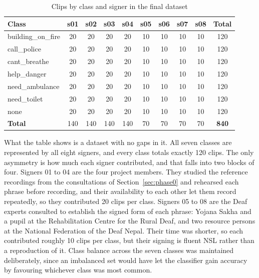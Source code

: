 \begin{table}[htbp]
    \centering
    \caption{Clips by class and signer in the final dataset}
    \label{tab:composition}
    \small
    \setlength{\tabcolsep}{4pt}
    \begin{tabular}{lcccccccc|c}
        \toprule
        \textbf{Class} & \textbf{s01} & \textbf{s02} & \textbf{s03} & \textbf{s04}
                       & \textbf{s05} & \textbf{s06} & \textbf{s07} & \textbf{s08} & \textbf{Total} \\
        \midrule
        building\_on\_fire & 20 & 20 & 20 & 20 & 10 & 10 & 10 & 10 & 120 \\
        call\_police       & 20 & 20 & 20 & 20 & 10 & 10 & 10 & 10 & 120 \\
        cant\_breathe      & 20 & 20 & 20 & 20 & 10 & 10 & 10 & 10 & 120 \\
        help\_danger       & 20 & 20 & 20 & 20 & 10 & 10 & 10 & 10 & 120 \\
        need\_ambulance    & 20 & 20 & 20 & 20 & 10 & 10 & 10 & 10 & 120 \\
        need\_toilet       & 20 & 20 & 20 & 20 & 10 & 10 & 10 & 10 & 120 \\
        none               & 20 & 20 & 20 & 20 & 10 & 10 & 10 & 10 & 120 \\
        \midrule
        \textbf{Total} & 140 & 140 & 140 & 140 & 70 & 70 & 70 & 70 & \textbf{840} \\
        \bottomrule
    \end{tabular}
\end{table}

\noindent What the table shows is a dataset with no gaps in it. All seven classes are represented by all eight signers, and every class totals exactly 120 clips. The only asymmetry is how much each signer contributed, and that falls into two blocks of four. Signers 01 to 04 are the four project members. They studied the reference recordings from the consultations of Section~\ref{sec:phase0} and rehearsed each phrase before recording, and their availability to each other let them record repeatedly, so they contributed 20 clips per class. Signers 05 to 08 are the Deaf experts consulted to establish the signed form of each phrase: Yojana Sakha and a pupil at the Rehabilitation Centre for the Rural Deaf, and two resource persons at the National Federation of the Deaf Nepal. Their time was shorter, so each contributed roughly 10 clips per class, but their signing is fluent NSL rather than a reproduction of it. Class balance across the seven classes was maintained deliberately, since an imbalanced set would have let the classifier gain accuracy by favouring whichever class was most common.

